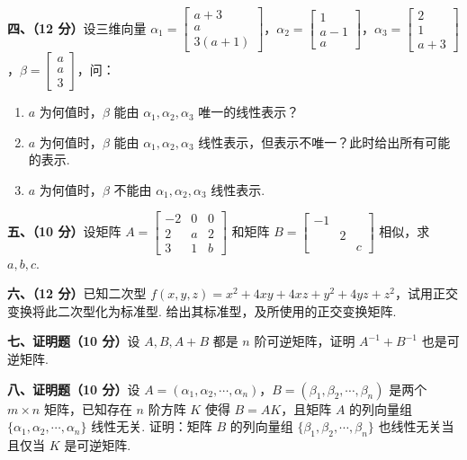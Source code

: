 \documentclass[a4paper,11pt]{ctexart}
\begin{document}
\textbf{四、（12 分）}设三维向量 $\alpha_1 = \begin{bmatrix} a + 3 \\ a \\ 3(a + 1) \end{bmatrix}$，$\alpha_2 = \begin{bmatrix} 1 \\ a - 1 \\ a \end{bmatrix}$，$\alpha_3 = \begin{bmatrix} 2 \\ 1 \\ a + 3 \end{bmatrix}$，$\beta = \begin{bmatrix} a \\ a \\ 3 \end{bmatrix}$，问：
\begin{enumerate}[label=(\arabic*), leftmargin=2.4em, itemsep=0.25em, topsep=0.3em]
  \item $a$ 为何值时，$\beta$ 能由 $\alpha_1, \alpha_2, \alpha_3$ 唯一的线性表示？
  \item $a$ 为何值时，$\beta$ 能由 $\alpha_1, \alpha_2, \alpha_3$ 线性表示，但表示不唯一？此时给出所有可能的表示.
  \item $a$ 为何值时，$\beta$ 不能由 $\alpha_1, \alpha_2, \alpha_3$ 线性表示.
\end{enumerate}

\vspace{0.7em}

\textbf{五、（10 分）}设矩阵 $A = \begin{bmatrix} -2 & 0 & 0 \\ 2 & a & 2 \\ 3 & 1 & b \end{bmatrix}$ 和矩阵 $B = \begin{bmatrix} -1 & & \\ & 2 & \\ & & c \end{bmatrix}$ 相似，求 $a, b, c$.

\vspace{0.7em}

\textbf{六、（12 分）}已知二次型 $f(x, y, z) = x^2 + 4xy + 4xz + y^2 + 4yz + z^2$，试用正交变换将此二次型化为标准型. 给出其标准型，及所使用的正交变换矩阵.

\vspace{0.7em}

\textbf{七、证明题（10 分）}设 $A, B, A + B$ 都是 $n$ 阶可逆矩阵，证明 $A^{-1} + B^{-1}$ 也是可逆矩阵.

\vspace{0.7em}

\textbf{八、证明题（10 分）}设 $A = (\alpha_1, \alpha_2, \cdots, \alpha_n)$，$B = (\beta_1, \beta_2, \cdots, \beta_n)$ 是两个 $m \times n$ 矩阵，已知存在 $n$ 阶方阵 $K$ 使得 $B = AK$，且矩阵 $A$ 的列向量组 $\{\alpha_1, \alpha_2, \cdots, \alpha_n\}$ 线性无关. 证明：矩阵 $B$ 的列向量组 $\{\beta_1, \beta_2, \cdots, \beta_n\}$ 也线性无关当且仅当 $K$ 是可逆矩阵.
\end{document}
